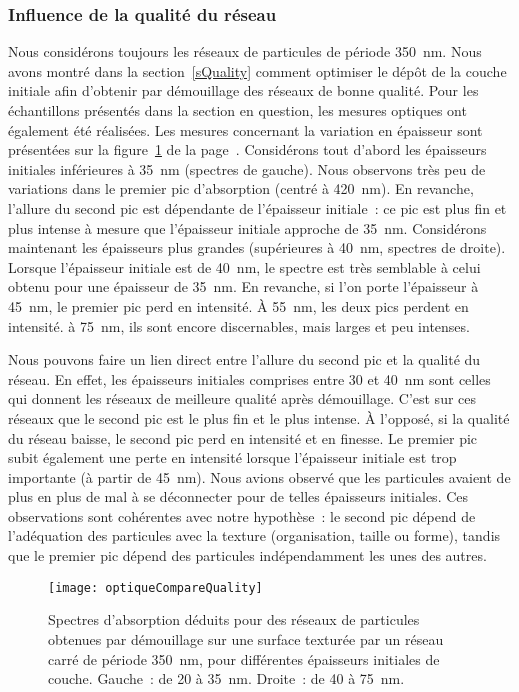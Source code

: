 	\subsubsection{Influence de la qualité du réseau}
Nous considérons toujours les réseaux de particules de période 350~nm. Nous avons montré dans la section~\ref{sQuality} comment optimiser le dépôt de la couche initiale afin d'obtenir par démouillage des réseaux de bonne qualité. Pour les échantillons présentés dans la section en question, les mesures optiques ont également été réalisées. Les mesures concernant la variation en épaisseur sont présentées sur la figure~\ref{optiqueCompareQuality} de la page~\pageref{optiqueCompareQuality}. Considérons tout d'abord les épaisseurs initiales inférieures à 35~nm (spectres de gauche). Nous observons très peu de variations dans le premier pic d'absorption (centré à 420~nm). En revanche, l'allure du second pic est dépendante de l'épaisseur initiale~: ce pic est plus fin et plus intense à mesure que l'épaisseur initiale approche de 35~nm. Considérons maintenant les épaisseurs plus grandes (supérieures à 40~nm, spectres de droite). Lorsque l'épaisseur initiale est de 40~nm, le spectre est très semblable à celui obtenu pour une épaisseur de 35~nm. En revanche, si l'on porte l'épaisseur à 45~nm, le premier pic perd en intensité. À 55~nm, les deux pics perdent en intensité. à 75~nm, ils sont encore discernables, mais larges et peu intenses.\par  
Nous pouvons faire un lien direct entre l'allure du second pic et la qualité du réseau. En effet, les épaisseurs initiales comprises entre 30 et 40~nm sont celles qui donnent les réseaux de meilleure qualité après démouillage. C'est sur ces réseaux que le second pic est le plus fin et le plus intense. À l'opposé, si la qualité du réseau baisse, le second pic perd en intensité et en finesse. Le premier pic subit également une perte en intensité lorsque l'épaisseur initiale est trop importante (à partir de 45~nm). Nous avions observé que les particules avaient de plus en plus de mal à se déconnecter pour de telles épaisseurs initiales. Ces observations sont cohérentes avec notre hypothèse~: le second pic dépend de l'adéquation des particules avec la texture (organisation, taille ou forme), tandis que le premier pic dépend des particules indépendamment les unes des autres.\par 
\begin{figure}[!p]
\centering
\texttt{[image: optiqueCompareQuality]}
\caption{Spectres d’absorption déduits pour des réseaux de particules obtenues par démouillage sur une surface texturée par un réseau carré de période 350~nm, pour différentes épaisseurs initiales de couche. Gauche~: de 20 à 35~nm. Droite~: de 40 à 75~nm.}
\label{optiqueCompareQuality}
\end{figure}
